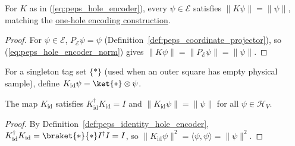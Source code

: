 \begin{lemma}
    \label{thm:peps_hole_encoder_norm_on_span}
    \leanok
    For $K$ as in (\ref{eq:peps_hole_encoder}), every $\psi\in\mathcal E$
    satisfies $\|K\psi\|=\|\psi\|$, matching the
    \href{https://github.com/openai/math/blob/adc7f1241b42e322a6451854ab7e4b4c146bf78a/preprints/Polynomial-PEPS-approximation-of-gapped-square-grid-ground-states-September-24-2026/build/sections/05-frames.tex\#L62-L64}{one-hole encoding construction}.
\end{lemma}
\begin{proof}
    \leanok
    For $\psi\in\mathcal E$, $P_{\mathcal E}\psi=\psi$
    (Definition~\ref{def:peps_coordinate_projector}), so (\ref{eq:peps_hole_encoder_norm})
    gives $\|K\psi\|=\|P_{\mathcal E}\psi\|=\|\psi\|$.
\end{proof}

\begin{definition}
    \label{def:peps_identity_hole_encoder}
    \leanok
    For a singleton tag set $\{\ast\}$ (used when an outer square has empty
    physical sample), define $K_{\mathrm{id}}\psi=\ket{\ast}\otimes\psi$.
\end{definition}

\begin{lemma}
    \label{thm:peps_identity_hole_encoder}
    \leanok
    The map $K_{\mathrm{id}}$ satisfies $K_{\mathrm{id}}^\dagger K_{\mathrm{id}}=I$
    and $\|K_{\mathrm{id}}\psi\|=\|\psi\|$ for all $\psi\in\mathcal H_V$.
\end{lemma}
\begin{proof}
    \leanok
    By Definition~\ref{def:peps_identity_hole_encoder},
    $K_{\mathrm{id}}^\dagger K_{\mathrm{id}}=\braket{\ast}{\ast}I^\dagger I=I$, so
    $\|K_{\mathrm{id}}\psi\|^2=\langle\psi,\psi\rangle=\|\psi\|^2$.
\end{proof}

